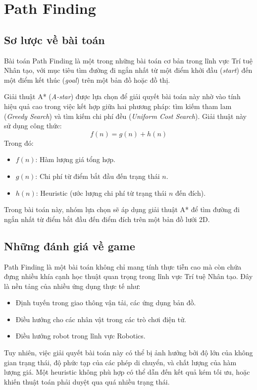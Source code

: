 \section{Path Finding}
\subsection{Sơ lược về bài toán}
Bài toán Path Finding là một trong những bài toán cơ bản trong lĩnh vực Trí tuệ Nhân tạo, với mục tiêu tìm đường đi ngắn nhất từ một điểm khởi đầu (\textit{start}) đến một điểm kết thúc (\textit{goal}) trên một bản đồ hoặc đồ thị. 

Giải thuật A* (\textit{A-star}) được lựa chọn để giải quyết bài toán này nhờ vào tính hiệu quả cao trong việc kết hợp giữa hai phương pháp: tìm kiếm tham lam (\textit{Greedy Search}) và tìm kiếm chi phí đều (\textit{Uniform Cost Search}). Giải thuật này sử dụng công thức:
\[
f(n) = g(n) + h(n)
\]
Trong đó:
\begin{itemize}
    \item $f(n)$: Hàm lượng giá tổng hợp.
    \item $g(n)$: Chi phí từ điểm bắt đầu đến trạng thái $n$.
    \item $h(n)$: Heuristic (ước lượng chi phí từ trạng thái $n$ đến đích).
\end{itemize}

Trong bài toán này, nhóm lựa chọn sẽ áp dụng giải thuật A* để tìm đường đi ngắn nhất từ điểm bắt đầu đến điểm đích trên một bản đồ lưới 2D.


\subsection{Những đánh giá về game}
Path Finding là một bài toán không chỉ mang tính thực tiễn cao mà còn chứa đựng nhiều khía cạnh học thuật quan trọng trong lĩnh vực Trí tuệ Nhân tạo. Đây là nền tảng của nhiều ứng dụng thực tế như:
\begin{itemize}
    \item Định tuyến trong giao thông vận tải, các ứng dụng bản đồ.
    \item Điều hướng cho các nhân vật trong các trò chơi điện tử.
    \item Điều hướng robot trong lĩnh vực Robotics.
\end{itemize}
Tuy nhiên, việc giải quyết bài toán này có thể bị ảnh hưởng bởi độ lớn của không gian trạng thái, độ phức tạp của các phép di chuyển, và chất lượng của hàm lượng giá. Một heuristic không phù hợp có thể dẫn đến kết quả kém tối ưu, hoặc khiến thuật toán phải duyệt qua quá nhiều trạng thái.

